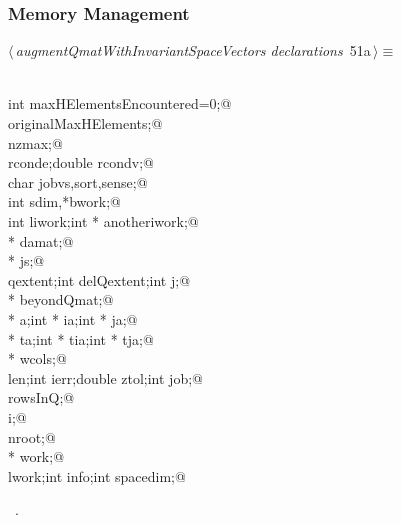 \documentclass{article}
\begin{document}
\subsubsection{Memory Management}
\begin{flushleft} \small
\begin{minipage}{\linewidth}\label{scrap72}\raggedright\small
{} $\langle\,${\itshape augmentQmatWithInvariantSpaceVectors declarations}\nobreak\ {\footnotesize {51a}}$\,\rangle\equiv$
\vspace{-1ex}
\begin{list}{}{} \item
\mbox{}\verb@@\\
\mbox{}\verb@static int maxHElementsEncountered=0;@\\
\mbox{}\verb@int originalMaxHElements;@\\
\mbox{}\verb@int nzmax;@\\
\mbox{}\verb@double rconde;double rcondv;@\\
\mbox{}\verb@  char jobvs,sort,sense;@\\
\mbox{}\verb@  int sdim,*bwork;@\\
\mbox{}\verb@  int liwork;int * anotheriwork;@\\
\mbox{}\verb@double * damat;@\\
\mbox{}\verb@int * js;@\\
\mbox{}\verb@int qextent;int delQextent;int j;@\\
\mbox{}\verb@double * beyondQmat;@\\
\mbox{}\verb@double * a;int * ia;int * ja;@\\
\mbox{}\verb@double * ta;int * tia;int * tja;@\\
\mbox{}\verb@int * wcols;@\\
\mbox{}\verb@int len;int ierr;double ztol;int job;@\\
\mbox{}\verb@int rowsInQ;@\\
\mbox{}\verb@int i;@\\
\mbox{}\verb@int nroot;@\\
\mbox{}\verb@double * work;@\\
\mbox{}\verb@int lwork;int info;int spacedim;@\\
\mbox{}\verb@@{\NWsep}
\end{list}
\vspace{-1.5ex}
\footnotesize
\begin{list}{}{\setlength{\itemsep}{-\parsep}\setlength{\itemindent}{-\leftmargin}}
\item \NWtxtMacroDefBy\ .

\end{list}
\end{minipage}
\end{flushleft}
\end{document}
